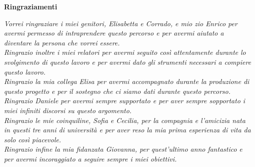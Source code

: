 \thispagestyle{empty}

\begin{center}
  {\bf \Huge Ringraziamenti}
\end{center}

\vspace{4cm}
\emph{Vorrei ringraziare i miei genitori, Elisabetta e Corrado, e mio zio Enrico per avermi permesso di intraprendere questo percorso e per avermi aiutato a diventare la persona che vorrei essere.\\[12pt]
	Ringrazio inoltre i miei relatori per avermi seguito cos\`i attentamente durante lo svolgimento di questo lavoro e per avermi dato gli strumenti necessari a compiere questo lavoro.\\[12pt]
	Ringrazio la mia collega Elisa per avermi accompagnato durante la produzione di questo progetto e per il sostegno che ci siamo dati durante questo percorso.\\[12pt]
	Ringrazio Daniele per avermi sempre supportato e per aver sempre sopportato i miei infiniti discorsi su questo argomento.\\[12pt]
	Ringrazio le mie coinquiline, Sofia e Cecilia, per la compagnia e l'amicizia nata in questi tre anni di universit\`a e per aver reso la mia prima esperienza di vita da solo cos\`i piacevole.\\[12pt]
	Ringrazio infine la mia fidanzata Giovanna, per quest'ultimo anno fantastico e per avermi incoraggiato a seguire sempre i miei obiettivi.
}
